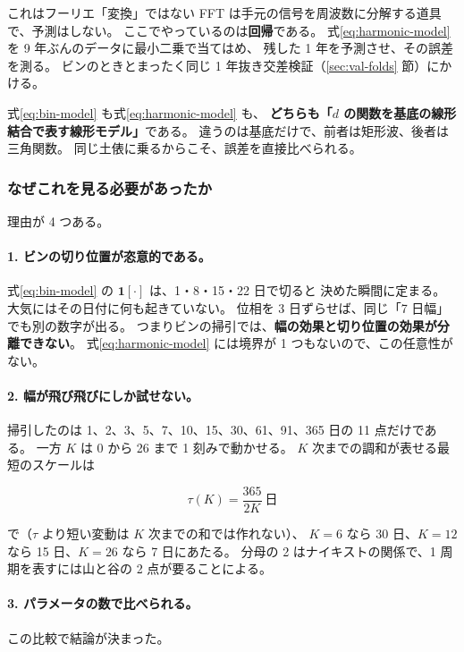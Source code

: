 \begin{whybox}{これはフーリエ「変換」ではない}
FFT は手元の信号を周波数に分解する道具で、予測はしない。
ここでやっているのは\textbf{回帰}である。
式\eqref{eq:harmonic-model} を 9 年ぶんのデータに最小二乗で当てはめ、
残した 1 年を予測させ、その誤差を測る。
ビンのときとまったく同じ 1 年抜き交差検証（\ref{sec:val-folds} 節）にかける。

式\eqref{eq:bin-model} も式\eqref{eq:harmonic-model} も、
\textbf{どちらも「$d$ の関数を基底の線形結合で表す線形モデル」}である。
違うのは基底だけで、前者は矩形波、後者は三角関数。
同じ土俵に乗るからこそ、誤差を直接比べられる。
\end{whybox}

\subsubsection{なぜこれを見る必要があったか}

理由が 4 つある。

\paragraph{1. ビンの切り位置が恣意的である。}
式\eqref{eq:bin-model} の $\mathbf{1}[\cdot]$ は、1・8・15・22 日で切ると
決めた瞬間に定まる。大気にはその日付に何も起きていない。
位相を 3 日ずらせば、同じ「7 日幅」でも別の数字が出る。
つまりビンの掃引では、\textbf{幅の効果と切り位置の効果が分離できない}。
式\eqref{eq:harmonic-model} には境界が 1 つもないので、この任意性がない。

\paragraph{2. 幅が飛び飛びにしか試せない。}
掃引したのは \num{1}、\num{2}、\num{3}、\num{5}、\num{7}、\num{10}、\num{15}、\num{30}、\num{61}、\num{91}、\num{365} 日の 11 点だけである。
一方 $K$ は 0 から 26 まで 1 刻みで動かせる。
$K$ 次までの調和が表せる最短のスケールは

\begin{equation}
  \tau(K) = \frac{365}{2K}\ \text{日}
  \label{eq:harmonic-resolution}
\end{equation}

で（$\tau$ より短い変動は $K$ 次までの和では作れない）、
$K = 6$ なら \num{30} 日、$K = 12$ なら \num{15} 日、$K = 26$ なら \num{7} 日にあたる。
分母の 2 はナイキストの関係で、1 周期を表すには山と谷の 2 点が要ることによる。

\paragraph{3. パラメータの数で比べられる。}
この比較で結論が決まった。

